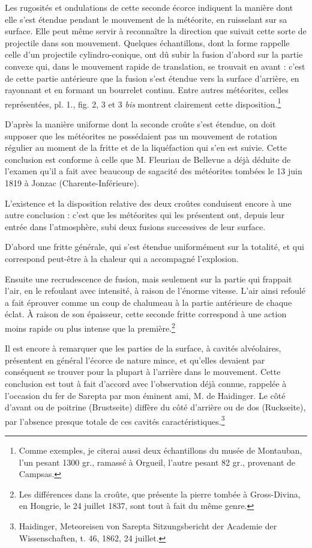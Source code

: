\documentclass[a4paper, 11pt, oneside, polutonikogreek, french]{article}
\begin{document}
Les rugosités et ondulations de cette seconde écorce indiquent la manière dont elle s'est étendue pendant le mouvement de la météorite, en ruisselant sur sa surface. Elle peut même servir à reconnaître la direction que suivait cette sorte de projectile dans son mouvement. Quelques échantillons, dont la forme rappelle celle d'un projectile cylindro-conique, ont dû subir la fusion d'abord sur la partie convexe qui, dans le mouvement rapide de translation, se trouvait en avant : c'est de cette partie antérieure que la fusion s'est étendue vers la surface d'arrière, en rayonnant et en formant un bourrelet continu. Entre autres météorites, celles représentées, pl. 1., fig. 2, 3 et 3 \emph{bis} montrent clairement cette disposition.\footnote{Comme exemples, je citerai aussi deux échantillons du musée de Montauban, l'un pesant 1300 gr., ramassé à Orgueil, l'autre pesant 82 gr., provenant de Campsas.}

D'après la manière uniforme dont la seconde croûte s'est étendue, on doit supposer que les météorites ne possédaient pas un mouvement de rotation régulier au moment de la fritte et de la liquéfaction qui s'en est suivie. Cette conclusion est conforme à celle que M. Fleuriau de Bellevue a déjà déduite de l'examen qu'il a fait avec beaucoup de sagacité des météorites tombées le 13 juin 1819 à Jonzac (Charente-Inférieure).

L'existence et la disposition relative des deux croûtes conduisent encore à une autre conclusion : c'est que les météorites qui les présentent ont, depuis leur entrée dans l'atmosphère, subi deux fusions successives de leur surface.

D'abord une fritte générale, qui s'est étendue uniformément sur la totalité, et qui correspond peut-être à la chaleur qui a accompagné l'explosion.

Ensuite une recrudescence de fusion, mais seulement sur la partie qui frappait l'air, en le refoulant avec intensité, à raison de l'énorme vitesse. L'air ainsi refoulé a fait éprouver comme un coup de chalumeau à la partie antérieure de chaque éclat. À raison de son épaisseur, cette seconde fritte correspond à une action moins rapide ou plus intense que la première.\footnote{Les différences dans la croûte, que présente la pierre tombée à Gross-Divina, en Hongrie, le 24 juillet 1837, sont tout à fait du même genre.}

Il est encore à remarquer que les parties de la surface, à cavités alvéolaires, présentent en général l'écorce de nature mince, et qu'elles devaient par conséquent se trouver pour la plupart à l'arrière dans le mouvement. Cette conclusion est tout à fait d'accord avec l'observation déjà connue, rappelée à l'occasion du fer de Sarepta par mon éminent ami, M. de Haidinger. Le côté d'avant ou de poitrine (Brustseite) diffère du côté d'arrière ou de dos (Ruckseite), par l'absence presque totale de ces cavités caractéristiques.\footnote{Haidinger, Meteoreisen von Sarepta Sitzungsbericht der Academie der Wissenschaften, t. 46, 1862, 24 juillet.}
\end{document}

